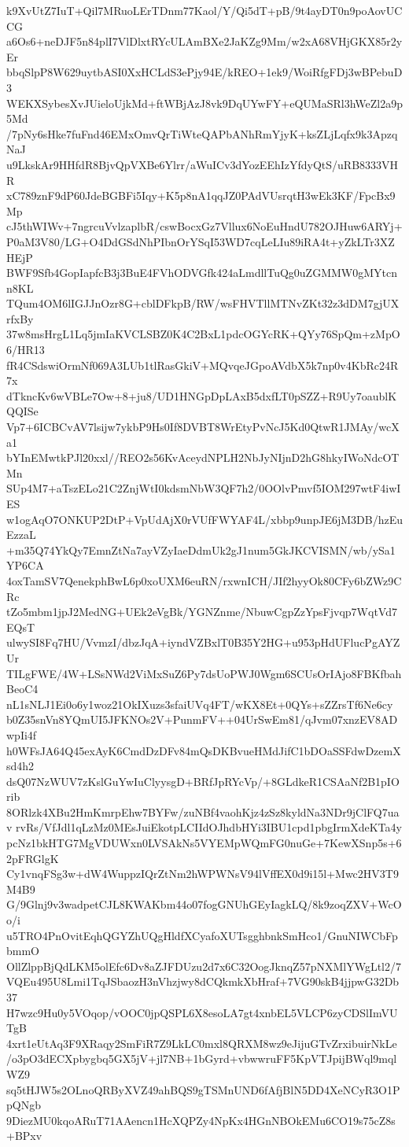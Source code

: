 k9XvUtZ7IuT+Qil7MRuoLErTDnm77Kaol/Y/Qi5dT+pB/9t4ayDT0n9poAovUCCG
a6Os6+neDJF5n84plI7VlDlxtRYcULAmBXe2JaKZg9Mm/w2xA68VHjGKX85r2yEr
bbqSlpP8W629uytbASI0XxHCLdS3ePjy94E/kREO+1ek9/WoiRfgFDj3wBPebuD3
WEKXSybesXvJUieloUjkMd+ftWBjAzJ8vk9DqUYwFY+eQUMaSRl3hWeZl2a9p5Md
/7pNy6sHke7fuFnd46EMxOmvQrTiWteQAPbANhRmYjyK+ksZLjLqfx9k3ApzqNaJ
u9LkskAr9HHfdR8BjvQpVXBe6Ylrr/aWuICv3dYozEEhIzYfdyQtS/uRB8333VHR
xC789znF9dP60JdeBGBFi5Iqy+K5p8nA1qqJZ0PAdVUsrqtH3wEk3KF/FpcBx9Mp
cJ5thWIWv+7ngrcuVvlzaplbR/cswBocxGz7Vllux6NoEuHndU782OJHuw6ARYj+
P0aM3V80/LG+O4DdGSdNhPIbnOrYSqI53WD7cqLeLIu89iRA4t+yZkLTr3XZHEjP
BWF9Sfb4GopIapfcB3j3BuE4FVhODVGfk424aLmdllTuQg0uZGMMW0gMYtcnn8KL
TQum4OM6lIGJJnOzr8G+cblDFkpB/RW/wsFHVTllMTNvZKt32z3dDM7gjUXrfxBy
37w8msHrgL1Lq5jmIaKVCLSBZ0K4C2BxL1pdcOGYcRK+QYy76SpQm+zMpO6/HR13
fR4CSdswiOrmNf069A3LUb1tlRasGkiV+MQvqeJGpoAVdbX5k7np0v4KbRc24R7x
dTkncKv6wVBLe7Ow+8+ju8/UD1HNGpDpLAxB5dxfLT0pSZZ+R9Uy7oaublKQQISe
Vp7+6ICBCvAV7lsijw7ykbP9Hs0If8DVBT8WrEtyPvNcJ5Kd0QtwR1JMAy/wcXa1
bYInEMwtkPJl20xxl//REO2s56KvAceydNPLH2NbJyNIjnD2hG8hkyIWoNdcOTMn
SUp4M7+aTszELo21C2ZnjWtI0kdsmNbW3QF7h2/0OOlvPmvf5IOM297wtF4iwIES
w1ogAqO7ONKUP2DtP+VpUdAjX0rVUfFWYAF4L/xbbp9unpJE6jM3DB/hzEuEzzaL
+m35Q74YkQy7EmnZtNa7ayVZyIaeDdmUk2gJ1num5GkJKCVISMN/wb/ySa1YP6CA
4oxTamSV7QenekphBwL6p0xoUXM6euRN/rxwnICH/JIf2hyyOk80CFy6bZWz9CRc
tZo5mbm1jpJ2MedNG+UEk2eVgBk/YGNZnme/NbuwCgpZzYpsFjvqp7WqtVd7EQsT
ulwySI8Fq7HU/VvmzI/dbzJqA+iyndVZBxlT0B35Y2HG+u953pHdUFlucPgAYZUr
TILgFWE/4W+LSsNWd2ViMxSuZ6Py7dsUoPWJ0Wgm6SCUsOrIAjo8FBKfbahBeoC4
nL1sNLJ1Ei0o6y1woz21OkIXuzs3sfaiUVq4FT/wKX8Et+0QYs+sZZrsTf6Ne6cy
b0Z35snVn8YQmUI5JFKNOs2V+PunmFV++04UrSwEm81/qJvm07xnzEV8ADwpIi4f
h0WFsJA64Q45exAyK6CmdDzDFv84mQsDKBvueHMdJifC1bDOaSSFdwDzemXsd4h2
dsQ07NzWUV7zKslGuYwIuClyysgD+BRfJpRYcVp/+8GLdkeR1CSAaNf2B1pIOrib
8ORlzk4XBu2HmKmrpEhw7BYFw/zuNBf4vaohKjz4zSz8kyldNa3NDr9jClFQ7uav
rvRs/VfJdl1qLzMz0MEsJuiEkotpLCIIdOJhdbHYi3IBU1cpd1pbgIrmXdeKTa4y
pcNz1bkHTG7MgVDUWxn0LVSAkNs5VYEMpWQmFG0nuGe+7KewXSnp5s+62pFRGlgK
Cy1vnqFSg3w+dW4WuppzIQrZtNm2hWPWNsV94lVffEX0d9i15l+Mwc2HV3T9M4B9
G/9Glnj9v3wadpetCJL8KWAKbm44o07fogGNUhGEyIagkLQ/8k9zoqZXV+WcOo/i
u5TRO4PnOvitEqhQGYZhUQgHldfXCyafoXUTsgghbnkSmHco1/GnuNIWCbFpbmmO
OllZlppBjQdLKM5olEfc6Dv8aZJFDUzu2d7x6C32OogJknqZ57pNXMlYWgLtl2/7
VQEu495U8Lmi1TqJSbaozH3nVhzjwy8dCQkmkXbHraf+7VG90skB4jjpwG32Db37
H7wzc9Hu0y5VOqop/vOOC0jpQSPL6X8esoLA7gt4xnbEL5VLCP6zyCDSlImVUTgB
4xrt1eUtAq3F9XRaqy2SmFiR7Z9LkLC0mxl8QRXM8wz9eJijuGTvZrxibuirNkLe
/o3pO3dECXpbygbq5GX5jV+jl7NB+1bGyrd+vbwwruFF5KpVTJpijBWql9mqlWZ9
sq5tHJW5s2OLnoQRByXVZ49ahBQS9gTSMnUND6fAfjBlN5DD4XeNCyR3O1PpQNgb
9DiezMU0kqoARuT71AAencn1HcXQPZy4NpKx4HGnNBOkEMu6CO19s75cZ8s+BPxv
